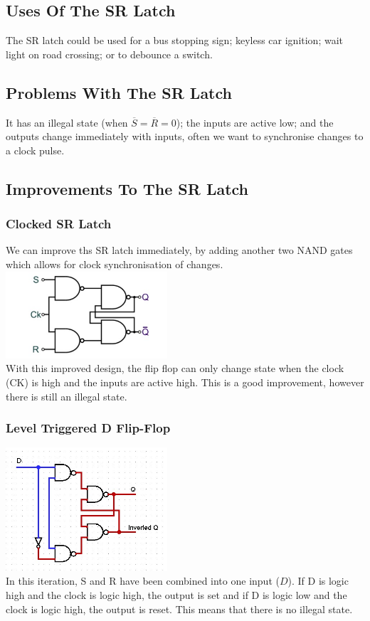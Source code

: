 \documentclass[a4paper,11pt, twocolumn]{article}
\begin{document}
\subsection{Uses Of The SR Latch}
The SR latch could be used for a bus stopping sign; keyless car ignition; wait light on road crossing; or to debounce a switch.
\subsection{Problems With The SR Latch}
It has an illegal state (when $\overline{S} = \overline{R} = 0$); the inputs are active low; and the outputs change immediately with inputs, often we want to synchronise changes to a clock pulse.
\subsection{Improvements To The SR Latch}
\subsubsection{Clocked SR Latch}
We can improve ths SR latch immediately, by adding another two NAND gates which allows for clock synchronisation of changes.\\
\includegraphics[width=0.45\textwidth]{srLatchClocked.jpg}\\
With this improved design, the flip flop can only change state when the clock (CK) is high and the inputs are active high. This is a good improvement, however there is still an illegal state. 
\subsubsection{Level Triggered D Flip-Flop}
\includegraphics[width=0.45\textwidth]{levelTriggered.jpg}\\
In this iteration, S and R have been combined into one input ($D$). If D is logic high and the clock is logic high, the output is set and if D is logic low and the clock is logic high, the output is reset. This means that there is no illegal state.
\end{document}
